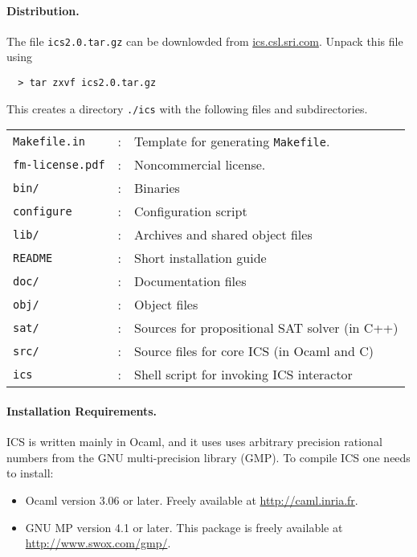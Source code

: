\documentclass[12pt]{article}
\begin{document}
\paragraph{Distribution.}
The file \texttt{ics2.0.tar.gz} can be downlowded from \url{ics.csl.sri.com}.
Unpack this file using
  \begin{verbatim}
  > tar zxvf ics2.0.tar.gz
  \end{verbatim}
This creates a directory \texttt{./ics} with the following files
and subdirectories.\\
  \begin{tabular}{lcl}
   \texttt{Makefile.in}  & : & Template for generating \texttt{Makefile}.  \\
   \texttt{fm-license.pdf} & : & Noncommercial license. \\
   \texttt{bin/} & : & Binaries \\
   \texttt{configure} & : & Configuration script \\
   \texttt{lib/} & : & Archives and shared object files  \\
   \texttt{README} & : & Short installation guide  \\
   \texttt{doc/} & : & Documentation files \\
   \texttt{obj/} & : & Object files \\
   \texttt{sat/} & : & Sources for propositional SAT solver (in C++) \\
   \texttt{src/} & : & Source files for core ICS (in Ocaml and C) \\
   \texttt{ics}  & : & Shell script for invoking ICS interactor \\
  \end{tabular}


\paragraph{Installation Requirements.}
ICS is written mainly in \textsf{Ocaml}, and it uses uses arbitrary
precision rational numbers from the GNU multi-precision library (GMP)\@.
To compile ICS one needs to install:
  \begin{itemize}
  \item \textsf{Ocaml} version 3.06 or later.
        Freely available at \url{http://caml.inria.fr}\@.
  \item \textsf{GNU MP} version 4.1 or later. This package is
        freely available at \url{http://www.swox.com/gmp/}\@.
  \end{itemize}
\end{document}
